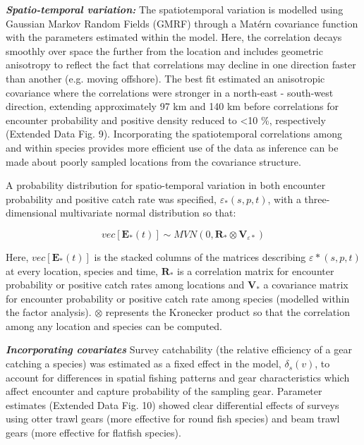 \documentclass{nature}
\begin{document}
\begin{linenumbers}
\textbf{\textit{Spatio-temporal variation:}} The spatiotemporal variation is
modelled using Gaussian Markov Random Fields (GMRF)  through a Matérn covariance function with the
parameters estimated within the model. Here, the correlation decays smoothly
over space the further from the location and includes geometric anisotropy to
reflect the fact that correlations may decline in one direction faster than
another (e.g.  moving offshore)\cite{Thorson2013}.  The best fit estimated an
anisotropic covariance where the correlations were stronger in a north-east -
south-west direction, extending approximately 97 km and 140 km before
correlations for encounter probability and positive density reduced to
\textless 10 \%, respectively (Extended Data Fig. 9). Incorporating the
spatiotemporal correlations among and within species provides more efficient
use of the data as inference can be made about poorly sampled locations from
the covariance structure.

A probability distribution for spatio-temporal variation in both encounter
probability and positive catch rate was specified, $\varepsilon_{*}(s,p,t)$,
with a three-dimensional multivariate normal distribution so that:

	\begin{equation}
		vec[\mathbf{E}_{*}(t)] \sim MVN(0,\mathbf{R}_{*} \otimes
		\mathbf{V}_{{\varepsilon}{*}})
	\end{equation}

Here, $vec[\mathbf{E}_{*}(t)]$ is the stacked columns of the matrices
describing $\varepsilon{*}(s,p,t)$ at every location, species and time,
$\mathbf{R}_{*}$ is a correlation matrix for encounter probability or positive
catch rates among locations and $\mathbf{V}_{*}$ a covariance matrix for
encounter probability or positive catch rate among species (modelled within the
factor analysis). $\otimes$ represents the Kronecker product so that the
correlation among any location and species can be computed\cite{Thorson2017}.
		
\textbf{\textit{Incorporating covariates}} Survey catchability (the relative
efficiency of a gear catching a species) was estimated as a fixed effect in the
model, $\delta_{s}(v)$, to account for differences in spatial fishing patterns
and gear characteristics which affect encounter and capture probability of the
sampling gear\cite{Thorson2014}. Parameter estimates (Extended Data Fig. 10)
showed clear differential effects of surveys using otter trawl gears (more
effective for round fish species) and beam trawl gears (more effective for
flatfish species).


\end{linenumbers}
\end{document}
